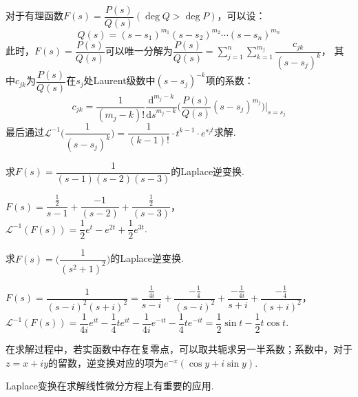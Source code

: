 \documentclass[openany,oneside]{ctexbook}
\begin{document}
对于有理函数$F(s)=\dfrac{P(s)}{Q(s)}(\deg Q>\deg P)$，可以设：
\[Q(s)=(s-s_1)^{m_1}(s-s_2)^{m_2}\cdots(s-s_n)^{m_n}\]
此时，$F(s)=\dfrac{P(s)}{Q(s)}$可以唯一分解为$\dfrac{P(s)}{Q(s)}=\displaystyle\sum_{j=1}^n\sum_{k=1}^{m_j}\dfrac{c_{jk}}{(s-s_j)^k}$，
其中$c_{jk}$为$\dfrac{P(s)}{Q(s)}$在$s_j$处Laurent级数中$(s-s_j)^{-k}$项的系数：
\[c_{jk}=\dfrac{1}{(m_j-k)!}\dfrac{\mathrm{d}^{m_j-k}}{\mathrm{d}s^{m_j-k}}\biggl(\dfrac{P(s)}{Q(s)}(s-s_j)^{m_j}\biggr)\bigg|_{s=s_j}\]
最后通过$\mathcal{L}^{-1}\biggl(\dfrac{1}{(s-s_j)^k}\biggr)=\dfrac{1}{(k-1)!}\cdot t^{k-1}\cdot e^{s_j t}$求解.
\begin{example}
    求$F(s)=\dfrac{1}{(s-1)(s-2)(s-3)}$的Laplace逆变换.
\end{example}
\begin{solution}
    $F(s)=\dfrac{\frac{1}{2}}{s-1}+\dfrac{-1}{(s-2)}+\dfrac{\frac{1}{2}}{(s-3)}$，\\
    $\mathcal{L}^{-1}(F(s))=\dfrac{1}{2}e^t-e^{2t}+\dfrac{1}{2}e^{3t}$.
\end{solution}
\begin{example}
    求$F(s)=\biggl(\dfrac{1}{(s^2+1)^2}\biggr)$的Laplace逆变换.
\end{example}
\begin{solution}
    $F(s)=\dfrac{1}{(s-i)^2(s+i)^2}=\dfrac{\frac{1}{4i}}{s-i}+\dfrac{-\frac{1}{4}}{(s-i)^2}+\dfrac{-\frac{1}{4i}}{s+i}+\dfrac{-\frac{1}{4}}{(s+i)^2}$，\\
    $\mathcal{L}^{-1}(F(s))=\dfrac{1}{4i}e^{it}-\dfrac{1}{4}te^{it}-\dfrac{1}{4i}e^{-it}-\dfrac{1}{4}te^{-it}=\dfrac{1}{2}\sin t-\dfrac{1}{2}t\cos t$.
\end{solution}
在求解过程中，若实函数中存在复零点，可以取共轭求另一半系数；系数中，对于$z=x+iy$的留数，逆变换对应的项为$e^{-x}(\cos y+i\sin y)$.
\par Laplace变换在求解线性微分方程上有重要的应用.
\end{document}
